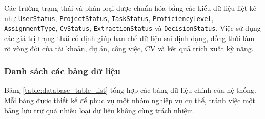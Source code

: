 \documentclass[../DoAn.tex]{subfiles}
\begin{document}
Các trường trạng thái và phân loại được chuẩn hóa bằng các kiểu dữ liệu liệt kê như \texttt{UserStatus}, \texttt{ProjectStatus}, \texttt{TaskStatus}, \texttt{ProficiencyLevel}, \texttt{AssignmentType}, \texttt{CvStatus}, \texttt{ExtractionStatus} và \texttt{DecisionStatus}. Việc sử dụng các giá trị trạng thái cố định giúp hạn chế dữ liệu sai định dạng, đồng thời làm rõ vòng đời của tài khoản, dự án, công việc, CV và kết quả trích xuất kỹ năng.

\subsubsection{Danh sách các bảng dữ liệu}
\label{subsubsection:4.2.3.3}
Bảng \ref{table:database_table_list} tổng hợp các bảng dữ liệu chính của hệ thống. Mỗi bảng được thiết kế để phục vụ một nhóm nghiệp vụ cụ thể, tránh việc một bảng lưu trữ quá nhiều loại dữ liệu không cùng trách nhiệm.
\end{document}
